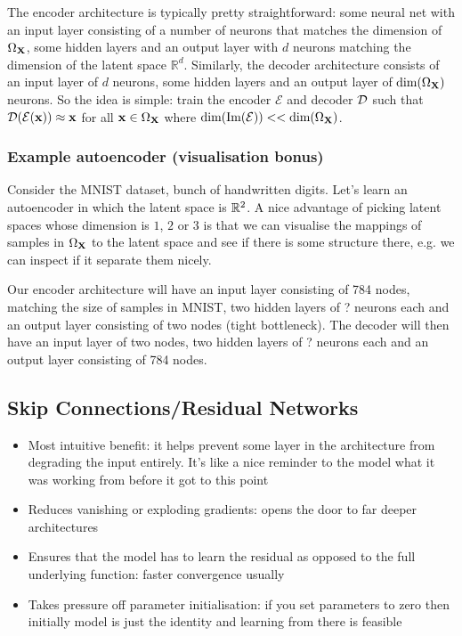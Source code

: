 \documentclass[11pt]{article}
\begin{document}
The encoder architecture is typically pretty straightforward: some neural net with an input layer consisting of a number of neurons that matches the dimension of $\Omega_{\mathbf{X}}$, some hidden layers and an output layer with $d$ neurons matching the dimension of the latent space $\mathbb{R}^d$. Similarly, the decoder architecture consists of an input layer of $d$ neurons, some hidden layers and an output layer of $\text{dim}(\Omega_{\mathbf{X}})$ neurons. So the idea is simple: train the encoder $\mathcal{E}$ and decoder $\mathcal{D}$ such that $\mathcal{D}(\mathcal{E}(\mathbf{x}))\approx\mathbf{x}$ for all $\mathbf{x}\in\Omega_{\mathbf{X}}$ where $\text{dim}(\text{Im}(\mathcal{E}))<<\text{dim}(\Omega_{\mathbf{X}})$.

\subsubsection{Example autoencoder (visualisation bonus)}
Consider the MNIST dataset, bunch of handwritten digits. Let's learn an autoencoder in which the latent space is $\mathbb{R}^2$. A nice advantage of picking latent spaces whose dimension is $1$, $2$ or $3$ is that we can visualise the mappings of samples in $\Omega_{\mathbf{X}}$ to the latent space and see if there is some structure there, e.g. we can inspect if it separate them nicely.

Our encoder architecture will have an input layer consisting of 784 nodes, matching the size of samples in MNIST, two hidden layers of ? neurons each and an output layer consisting of two nodes (tight bottleneck). The decoder will then have an input layer of two nodes, two hidden layers of ? neurons each and an output layer consisting of 784 nodes.

\subsection{Skip Connections/Residual Networks}
\begin{itemize}
    \item Most intuitive benefit: it helps prevent some layer in the architecture from degrading the input entirely. It's like a nice reminder to the model what it was working from before it got to this point
    \item Reduces vanishing or exploding gradients: opens the door to far deeper architectures
    \item Ensures that the model has to learn the residual as opposed to the full underlying function: faster convergence usually
    \item Takes pressure off parameter initialisation: if you set parameters to zero then initially model is just the identity and learning from there is feasible
\end{itemize}
\end{document}
